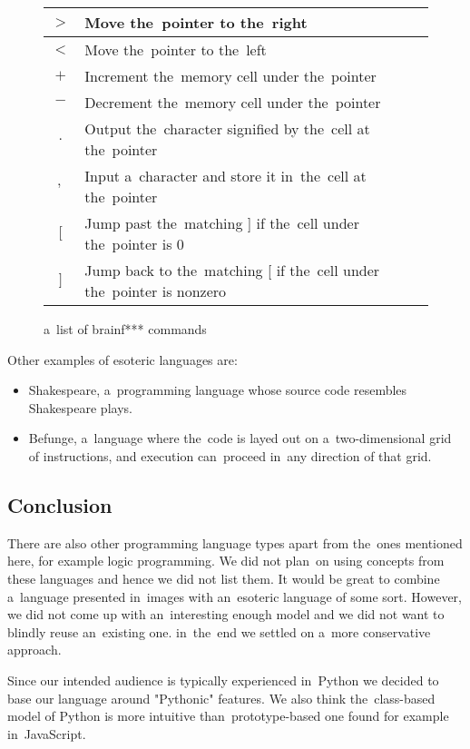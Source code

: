 \begin{figure}[!hbt]
    \centering
    \begin{tabular}{|c l |} 
    \hline
    $>$ & Move the~pointer to the~right \\
    \hline
    $<$ & Move the~pointer to the~left \\
    \hline
    $+$ & Increment the~memory cell under the~pointer \\
    \hline
    $-$ & Decrement the~memory cell under the~pointer \\
    \hline
    $.$ & Output the~character signified by the~cell at the~pointer \\
    \hline
    $,$ & Input a~character and store it in~the~cell at the~pointer \\
    \hline
    $[$ & Jump past the~matching ] if the~cell under the~pointer is 0 \\
    \hline
    $]$ & Jump back to the~matching [ if the~cell under the~pointer is nonzero \\
    \hline
    \end{tabular}
    \caption{a~list of brainf*** commands}
\end{figure}

Other examples of esoteric languages are:
\begin{itemize}
    \item Shakespeare, a~programming language whose source code resembles Shakespeare plays. 
    \item Befunge, a~language where the~code is layed out on a~two-dimensional grid of instructions, and execution can~proceed in~any direction of that grid.
\end{itemize}

\subsection{Conclusion}
There are also other programming language types apart from the~ones mentioned here, for example logic programming. We did not plan~on using
concepts from these languages and hence we did not list them. It would be great to combine a~language presented in~images with an~esoteric language
of some sort. However, we did not come up with an~interesting enough model and we did not want to blindly reuse an~existing one. in~the~end we settled on
a~more conservative approach.

Since our intended audience is typically experienced in~Python we decided to base our language around "Pythonic" features. We also think
the~class-based model of Python is more intuitive than~prototype-based one found for example in~JavaScript.

